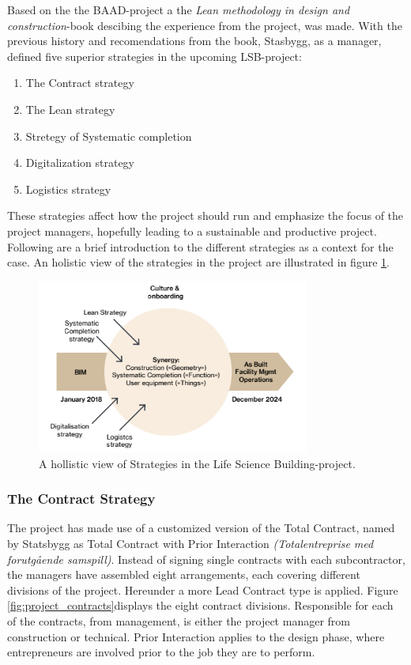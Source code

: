 Based on the the BAAD-project a the \textit{Lean methodology in design and construction}-book \citep{lean_i_praksis} descibing the experience from the project, was made. With the previous history and recomendations from the book, Stasbygg, as a manager, defined five superior strategies in the upcoming LSB-project: 
\begin{enumerate}
    \item The Contract strategy
    \item The Lean strategy
    \item Stretegy of Systematic completion
    \item Digitalization strategy
    \item Logistics strategy
\end{enumerate}
These strategies affect how the project should run and emphasize the focus of the project managers, hopefully leading to a sustainable and productive project. Following are a brief introduction to the different strategies as a context for the case. An holistic view of the strategies in the project are illustrated in figure \ref{fig:strategy}. 

\begin{figure}
    \centering
    \includegraphics[width=0.8\textwidth]{fig/LVB_strategy.png}
    \caption{A hollistic view of Strategies in the Life Science Building-project.}
    \label{fig:strategy}
\end{figure}

\subsubsection*{The Contract Strategy}
The project has made use of a customized version of the Total Contract, named by Statsbygg as Total Contract with Prior Interaction \textit{(Totalentreprise med forutgående samspill)}. Instead of signing single contracts with each subcontractor, the managers have assembled eight arrangements, each covering different divisions of the project. Hereunder a more Lead Contract type is applied. Figure \ref{fig:project_contracts}displays the eight contract divisions. Responsible for each of the contracts, from management, is either the project manager from construction or technical. Prior Interaction applies to the design phase, where entrepreneurs are involved prior to the job they are to perform. 

